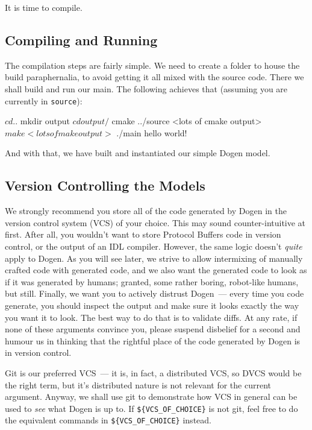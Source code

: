 \documentclass{book}
\begin{document}
It is time to compile.

\subsection{Compiling and Running}

The compilation steps are fairly simple. We need to create a folder to
house the build paraphernalia, to avoid getting it all mixed with the
source code. There we shall build and run our main. The following
achieves that (assuming you are currently in \texttt{source}):

\begin{pseudocode}[backgroundcolor=\color{lightgray}]
$ cd ..
$ mkdir output
$ cd output/
$ cmake ../source
<lots of cmake output>
$ make
<lots of make output>
$ ./main
hello world!
\end{pseudocode}

And with that, we have built and instantiated our simple Dogen model.

\subsection{Version Controlling the Models}

We strongly recommend you store all of the code generated by Dogen in
the version control system (VCS) of your choice. This may sound
counter-intuitive at first. After all, you wouldn't want to store
Protocol Buffers code in version control, or the output of an IDL
compiler. However, the same logic doesn't \emph{quite} apply to
Dogen. As you will see later, we strive to allow intermixing of
manually crafted code with generated code, and we also want the
generated code to look as if it was generated by humans; granted, some
rather boring, robot-like humans, but still. Finally, we want you to
actively distrust Dogen~--- every time you code generate, you should
inspect the output and make sure it looks exactly the way you want it
to look. The best way to do that is to validate diffs. At any rate, if
none of these arguments convince you, please suspend disbelief for a
second and humour us in thinking that the rightful place of the code
generated by Dogen is in version control.

Git is our preferred VCS~--- it is, in fact, a distributed VCS, so
DVCS would be the right term, but it's distributed nature is not
relevant for the current argument. Anyway, we shall use git to
demonstrate how VCS in general can be used to \emph{see} what Dogen is
up to. If \texttt{\$\{VCS\_OF\_CHOICE\}} is not git, feel free to do
the equivalent commands in \texttt{\$\{VCS\_OF\_CHOICE\}} instead.
\end{document}

